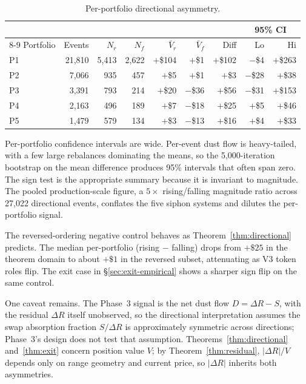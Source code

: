 \documentclass[11pt,a4paper]{article}
\theoremstyle{plain}
\begin{document}
\begin{table}[H]
\centering
\caption{Per-portfolio directional asymmetry.}
\label{tab:directional-phase3}
\begin{tabular}{@{}lrrrrrrrr@{}}
\toprule
 & & & & & & & \multicolumn{2}{c}{95\% CI} \\
\cmidrule(lr){8-9}
Portfolio & Events & $N_r$ & $N_f$ & $\bar V_r$ & $\bar V_f$ & Diff & Lo & Hi \\
\midrule
P1 & 21{,}810 & 5{,}413 & 2{,}622 & $+$\$104 & $+$\$1   & $+$\$102 & $-$\$4  & $+$\$263 \\
P2 & 7{,}066  & 935     & 457     & $+$\$5   & $+$\$1   & $+$\$3   & $-$\$28 & $+$\$38  \\
P3 & 3{,}391  & 793     & 214     & $+$\$20  & $-$\$36  & $+$\$56  & $-$\$31 & $+$\$153 \\
P4 & 2{,}163  & 496     & 189     & $+$\$7   & $-$\$18  & $+$\$25  & $+$\$5  & $+$\$46  \\
P5 & 1{,}479  & 579     & 134     & $+$\$3   & $-$\$13  & $+$\$16  & $+$\$4  & $+$\$33  \\
\bottomrule
\end{tabular}
\end{table}

Per-portfolio confidence intervals are wide. Per-event dust flow is heavy-tailed, with a few large rebalances dominating the means, so the 5{,}000-iteration bootstrap on the mean difference produces 95\% intervals that often span zero. The sign test is the appropriate summary because it is invariant to magnitude. The pooled production-scale figure, a $5\times$ rising/falling magnitude ratio across 27{,}022 directional events, conflates the five siphon systems and dilutes the per-portfolio signal.

The reversed-ordering negative control behaves as Theorem~\ref{thm:directional} predicts. The median per-portfolio (rising $-$ falling) drops from $+\$25$ in the theorem domain to about $+\$1$ in the reversed subset, attenuating as V3 token roles flip. The exit case in \S\ref{sec:exit-empirical} shows a sharper sign flip on the same control.

One caveat remains. The Phase~3 signal is the net dust flow $D = \Delta R - S$, with the residual $\Delta R$ itself unobserved, so the directional interpretation assumes the swap absorption fraction $S/\Delta R$ is approximately symmetric across directions; Phase~3's design does not test that assumption. Theorems~\ref{thm:directional} and~\ref{thm:exit} concern position value $V$; by Theorem~\ref{thm:residual}, $|\Delta R|/V$ depends only on range geometry and current price, so $|\Delta R|$ inherits both asymmetries.
\end{document}
